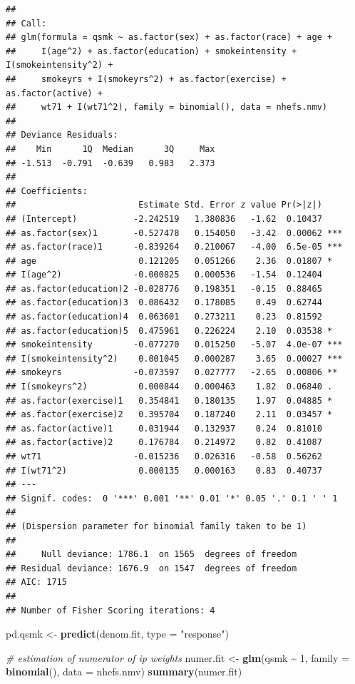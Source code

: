 \documentclass[
  10pt,
]{book}
\newenvironment{Shaded}{\begin{snugshade}}{\end{snugshade}}
\newcommand{\CommentTok}[1]{\textcolor[rgb]{0.56,0.35,0.01}{\textit{#1}}}
\newcommand{\DataTypeTok}[1]{\textcolor[rgb]{0.13,0.29,0.53}{#1}}
\newcommand{\DecValTok}[1]{\textcolor[rgb]{0.00,0.00,0.81}{#1}}
\newcommand{\KeywordTok}[1]{\textcolor[rgb]{0.13,0.29,0.53}{\textbf{#1}}}
\newcommand{\NormalTok}[1]{#1}
\newcommand{\OperatorTok}[1]{\textcolor[rgb]{0.81,0.36,0.00}{\textbf{#1}}}
\newcommand{\StringTok}[1]{\textcolor[rgb]{0.31,0.60,0.02}{#1}}
\begin{document}
\begin{verbatim}
## 
## Call:
## glm(formula = qsmk ~ as.factor(sex) + as.factor(race) + age + 
##     I(age^2) + as.factor(education) + smokeintensity + I(smokeintensity^2) + 
##     smokeyrs + I(smokeyrs^2) + as.factor(exercise) + as.factor(active) + 
##     wt71 + I(wt71^2), family = binomial(), data = nhefs.nmv)
## 
## Deviance Residuals: 
##    Min      1Q  Median      3Q     Max  
## -1.513  -0.791  -0.639   0.983   2.373  
## 
## Coefficients:
##                        Estimate Std. Error z value Pr(>|z|)    
## (Intercept)           -2.242519   1.380836   -1.62  0.10437    
## as.factor(sex)1       -0.527478   0.154050   -3.42  0.00062 ***
## as.factor(race)1      -0.839264   0.210067   -4.00  6.5e-05 ***
## age                    0.121205   0.051266    2.36  0.01807 *  
## I(age^2)              -0.000825   0.000536   -1.54  0.12404    
## as.factor(education)2 -0.028776   0.198351   -0.15  0.88465    
## as.factor(education)3  0.086432   0.178085    0.49  0.62744    
## as.factor(education)4  0.063601   0.273211    0.23  0.81592    
## as.factor(education)5  0.475961   0.226224    2.10  0.03538 *  
## smokeintensity        -0.077270   0.015250   -5.07  4.0e-07 ***
## I(smokeintensity^2)    0.001045   0.000287    3.65  0.00027 ***
## smokeyrs              -0.073597   0.027777   -2.65  0.00806 ** 
## I(smokeyrs^2)          0.000844   0.000463    1.82  0.06840 .  
## as.factor(exercise)1   0.354841   0.180135    1.97  0.04885 *  
## as.factor(exercise)2   0.395704   0.187240    2.11  0.03457 *  
## as.factor(active)1     0.031944   0.132937    0.24  0.81010    
## as.factor(active)2     0.176784   0.214972    0.82  0.41087    
## wt71                  -0.015236   0.026316   -0.58  0.56262    
## I(wt71^2)              0.000135   0.000163    0.83  0.40737    
## ---
## Signif. codes:  0 '***' 0.001 '**' 0.01 '*' 0.05 '.' 0.1 ' ' 1
## 
## (Dispersion parameter for binomial family taken to be 1)
## 
##     Null deviance: 1786.1  on 1565  degrees of freedom
## Residual deviance: 1676.9  on 1547  degrees of freedom
## AIC: 1715
## 
## Number of Fisher Scoring iterations: 4
\end{verbatim}

\begin{Shaded}
\begin{Highlighting}[]
\NormalTok{pd.qsmk \textless{}{-}}\StringTok{ }\KeywordTok{predict}\NormalTok{(denom.fit, }\DataTypeTok{type =} \StringTok{"response"}\NormalTok{)}

\CommentTok{\# estimation of numerator of ip weights}
\NormalTok{numer.fit \textless{}{-}}\StringTok{ }\KeywordTok{glm}\NormalTok{(qsmk }\OperatorTok{\textasciitilde{}}\StringTok{ }\DecValTok{1}\NormalTok{, }\DataTypeTok{family =} \KeywordTok{binomial}\NormalTok{(), }\DataTypeTok{data =}\NormalTok{ nhefs.nmv)}
\KeywordTok{summary}\NormalTok{(numer.fit)}
\end{Highlighting}
\end{Shaded}
\end{document}
